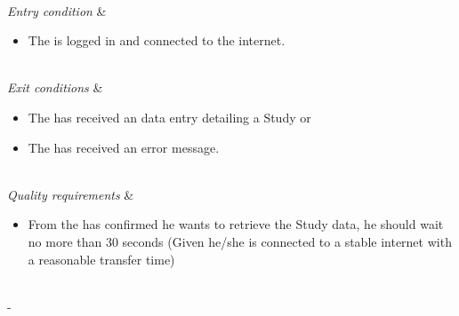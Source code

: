 \begin{table}[h!]
\begin{tabu}
\begin{enumerate}[leftmargin=*,topsep=0pt,itemsep=-1ex]
	\end{enumerate} \\
	\hline
	\textit{Entry condition} &
	\vspace{-3mm}
	\begin{itemize}[leftmargin=*,topsep=0pt,itemsep=-1ex]
		\item The \client is logged in and connected to the internet.
	\end{itemize} \\
	\hline
	\textit{Exit conditions} &
	\vspace{-3mm}
	\begin{itemize}[leftmargin=*,topsep=0pt,itemsep=-1ex]
		\item The \client has received an data entry detailing a Study or
		\item The \client has received an error message.
	\end{itemize} \\
	\hline
	\textit{Quality \newline requirements} &
	\vspace{-3mm}
	\begin{itemize}[leftmargin=*,topsep=0pt,itemsep=-1ex]
		\item From the \client has confirmed he wants to retrieve the Study data,  he should wait no more than 30 seconds (Given he/she is connected to a stable internet with a reasonable transfer time)
	\end{itemize} \\
	\tabucline[1.5pt]-
\end{tabu}
\caption{Use case: RetrieveStudyInformation}
\label{uc:RetrieveStudyInformation}
\end{table}
